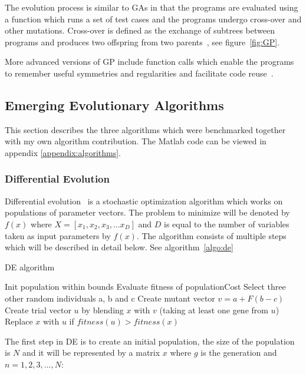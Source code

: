 The evolution process is similar to GAs in that the programs are evaluated using a function which runs a set of test cases and the programs undergo cross-over and other mutations. Cross-over is defined as the exchange of subtrees between programs and produces two offspring from two parents~\cite{Michalewicz1997}, see figure~\ref{fig:GP}.

More advanced versions of GP include function calls which enable the programs to remember useful symmetries and regularities and facilitate code reuse~\cite{Michalewicz1997}.

\subsection{Emerging Evolutionary Algorithms}

This section describes the three algorithms which were benchmarked together with my own algorithm contribution. The Matlab code can be viewed in appendix \ref{appendix:algorithms}.

\subsubsection{Differential Evolution}

Differential evolution~\cite{Storn1997} is a stochastic optimization algorithm which works on populations of parameter vectors. The problem to minimize will be denoted by $f(x)$ where $X=[x_1,x_2,x_3,...x_D]$ and $D$ is equal to the number of variables taken as input parameters by $f(x)$. The algorithm consists of multiple steps which will be described in detail below. See algorithm~\ref{algo:de}

\begin{algorithm}[h]
  \caption{DE algorithm}
  \label{algo:de}
    \begin{algorithmic}
      \State Init population within bounds
      \State Evaluate fitness of populationCost
      \Repeat
          \State Select three other random individuals a, b and c
          \State Create mutant vector $v=a+F(b-c)$
          \State Create trial vector $u$ by blending $x$ with $v$ (taking at least one gene from $u$)
          \State Replace $x$ with $u$ if $fitness(u) > fitness(x)$
        \EndFor
    \end{algorithmic}
\end{algorithm}

The first step in DE is to create an initial population, the size of the population is $N$ and it will be represented by a matrix $x$ where $g$ is the generation and $n=1,2,3,...,N$:

